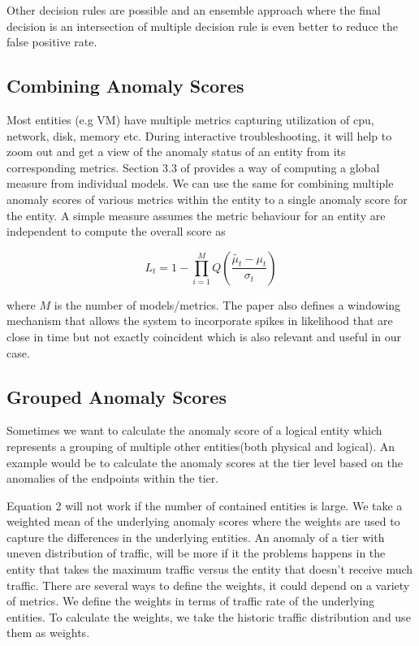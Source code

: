\documentclass[times, twoside, watermark]{zHenriquesLab-StyleBioRxiv}
\begin{document}
Other decision rules are possible and an ensemble approach where the final decision is an intersection of multiple decision rule is even better to reduce the false positive rate. 

\subsection*{Combining Anomaly Scores}
Most entities (e.g VM) have multiple metrics capturing utilization of cpu, network, disk, memory etc. During interactive troubleshooting, it will help to zoom out and get a view of the anomaly status of an entity from its corresponding metrics. Section 3.3 of \cite{ahmadpurdy} provides a way of computing a global measure from individual models. We can use the same for combining multiple anomaly scores of various metrics within the entity to a single anomaly score for the entity. A simple measure assumes the metric behaviour for an entity are independent to compute the overall score as 

\begin{equation}
L_t = 1 - \prod_{i = 1}^{M} Q(\frac{\tilde{\mu_t} - \mu_t}{\sigma_t})
\end{equation}

where $M$ is the number of models/metrics. The paper also defines a windowing mechanism that allows the system to incorporate spikes in likelihood that are close in time but not exactly coincident which is also relevant and useful in our case.

\subsection*{Grouped Anomaly Scores}
Sometimes we want to calculate the anomaly score of a logical entity which represents a grouping of multiple other entities(both physical and logical). An example would be to calculate the anomaly scores at the tier level based on the anomalies of the endpoints within the tier.

Equation 2 will not work if the number of contained entities is large. We take a weighted mean of the underlying anomaly scores where the weights are used to capture the differences in the underlying entities. An anomaly of a tier with uneven distribution of traffic, will be more if it the problems happens in the entity that takes the maximum traffic versus the entity that doesn't receive much traffic. There are several ways to define the weights, it could depend on a variety of metrics. We define the weights in terms of traffic rate of the underlying entities. To calculate the weights, we take the historic traffic distribution and use them as weights.
\end{document}
